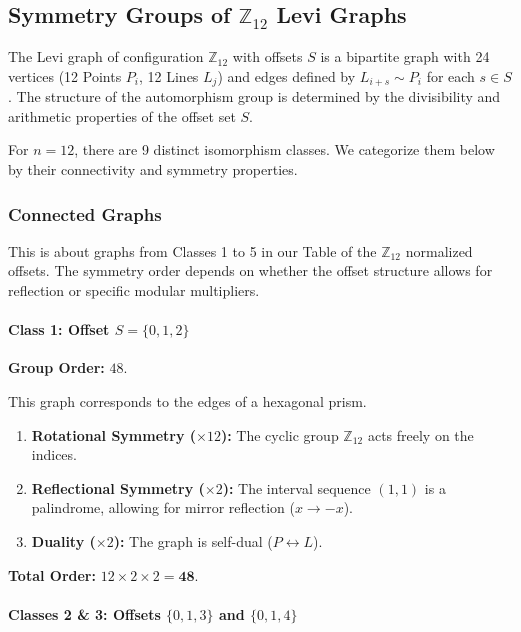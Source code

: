 \documentclass[12pt,letterpaper]{amsart}
\begin{document}
\subsection{Symmetry Groups of $\mathbb{Z}_{12}$ Levi Graphs}

The Levi graph of configuration $\mathbb{Z}_{12}$ with offsets $S$ is a bipartite graph with 24 vertices (12 Points $P_i$, 12 Lines $L_j$) and edges defined by $L_{i+s} \sim P_i$ for each $s \in S$. The structure of the automorphism group is determined by the divisibility and arithmetic properties of the offset set $S$.

For $n=12$, there are 9 distinct isomorphism classes. We categorize them below by their connectivity and symmetry properties.

\subsubsection{Connected Graphs}

This is about graphs from Classes 1 to 5 in our Table of the $\mathbb{Z}_{12}$ normalized offsets. The symmetry order depends on whether the offset structure allows for reflection or specific modular multipliers.

\paragraph{\bf Class 1: Offset $S = \{0, 1, 2\}$}

\textbf{Group Order:} $48$.

This graph corresponds to the edges of a hexagonal prism.
\begin{enumerate}
    \item \textbf{Rotational Symmetry ($\times 12$):} The cyclic group $\mathbb{Z}_{12}$ acts freely on the indices.
    \item \textbf{Reflectional Symmetry ($\times 2$):} The interval sequence $(1, 1)$ is a palindrome, allowing for mirror reflection ($x \to -x$).
    \item \textbf{Duality ($\times 2$):} The graph is self-dual ($P \leftrightarrow L$).
\end{enumerate}

\textbf{Total Order:} $12 \times 2 \times 2 = \mathbf{48}$.


\paragraph{\bf Classes 2 \& 3: Offsets $\{0, 1, 3\}$ and $\{0, 1, 4\}$}
\end{document}
